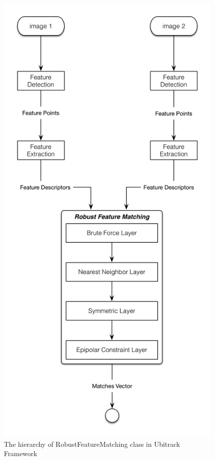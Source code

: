 \begin{figure}[H]
  \centering
  \includegraphics[width=140mm]{figures/robust_feature_matching}
  \caption{The hierarchy of RobustFeatureMatching class in Ubitrack Framework}\label{fig:cv_akaze_matching}
\end{figure}


